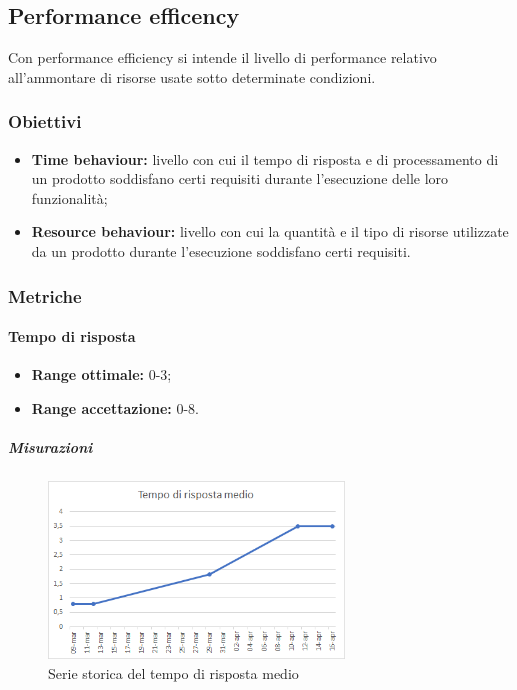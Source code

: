 	\subsection{Performance efficency}
		Con performance efficiency si intende il livello di performance relativo all'ammontare di risorse usate sotto determinate condizioni. 
		\subsubsection{Obiettivi}
			\begin{itemize}
				\item {\textbf{Time behaviour:} livello con cui il tempo di risposta e di processamento di un prodotto soddisfano certi requisiti durante l'esecuzione delle loro funzionalità;}
				\item {\textbf{Resource behaviour:} livello con cui la quantità e il tipo di risorse utilizzate da un prodotto durante l'esecuzione soddisfano certi requisiti.}
			\end{itemize}
		\subsubsection{Metriche}
			\paragraph{Tempo di risposta} \Spazio
			\begin{itemize}
				\item {\textbf{Range ottimale:} 0-3;}
				\item {\textbf{Range accettazione:} 0-8.}
			\end{itemize} 
		     \subparagraph{Misurazioni}
		      \begin{figure}[H]
		      \centering 
		      \includegraphics[width=0.7\textwidth]{Images/risposta.png}
		    	\caption{Serie storica del tempo di risposta medio}
		    	\label{risposta} 
		    \end{figure}
			
